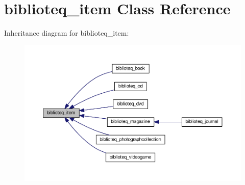 \hypertarget{classbiblioteq__item}{}\section{biblioteq\+\_\+item Class Reference}
\label{classbiblioteq__item}


Inheritance diagram for biblioteq\+\_\+item\+:
\nopagebreak
\begin{figure}[H]
\begin{center}
\leavevmode
\includegraphics[width=350pt]{classbiblioteq__item__inherit__graph}
\end{center}
\end{figure}
